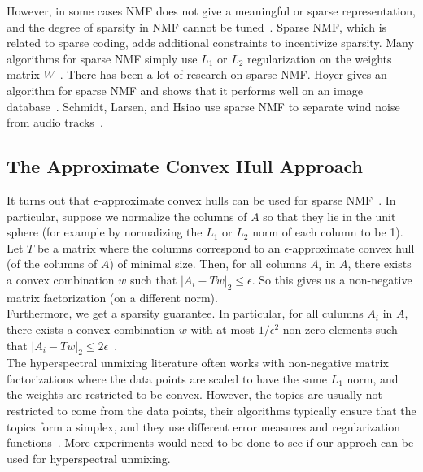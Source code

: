 However, in some cases NMF does not give a meaningful or sparse representation, and the degree of sparsity in NMF cannot be tuned~\cite{hoyer-nmf}. Sparse NMF, which is related to sparse coding, adds additional constraints to incentivize sparsity. Many algorithms for sparse NMF simply use $L_1$ or $L_2$ regularization on the weights matrix $W$~\cite{Lee97unsupervisedlearning, Berry2005, Mairal:2010:OLM:1756006.1756008, Murphy2012LearningEA}. There has been a lot of research on sparse NMF. Hoyer gives an algorithm for sparse NMF and shows that it performs well on an image database~\cite{hoyer-nmf}. Schmidt, Larsen, and Hsiao use sparse NMF to separate wind noise from audio tracks~\cite{schmidt-noise}. 

\subsection{The Approximate Convex Hull Approach}

It turns out that $\epsilon$-approximate convex hulls can be used for sparse NMF~\cite{blum-peled}. In particular, suppose we normalize the columns of $A$ so that they lie in the unit sphere (for example by normalizing the $L_1$ or $L_2$ norm of each column to be 1). Let $T$ be a matrix where the columns correspond to an $\epsilon$-approximate convex hull (of the columns of $A$) of minimal size. Then, for all columns $A_i$ in $A$, there exists a convex combination $w$ such that $|A_i - Tw|_2 \leq \epsilon$. So this gives us a non-negative matrix factorization (on a different norm).
\\

Furthermore, we get a sparsity guarantee. In particular, for all culumns $A_i$ in $A$, there exists a convex combination $w$ with at most $1/\epsilon^2$ non-zero elements such that $|A_i - Tw|_2 \leq 2\epsilon$~\cite{Har-Peled:2016:SEV:2984951.2984998, blum-peled}.
\\

The hyperspectral unmixing literature often works with non-negative matrix factorizations where the data points are scaled to have the same $L_1$ norm, and the weights are restricted to be convex. However, the topics are usually not restricted to come from the data points, their algorithms typically ensure that the topics form a simplex, and they use different error measures and regularization functions~\cite{6200362, gillis_survey}. More experiments would need to be done to see if our approch can be used for hyperspectral unmixing.
\\


